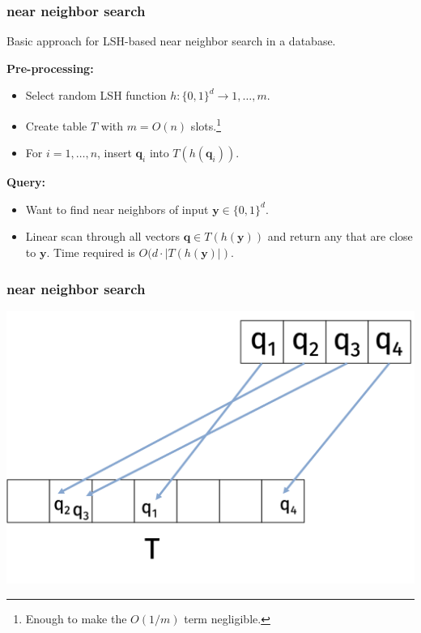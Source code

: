 \documentclass[compress]{beamer}
\newcommand{\bv}[1]{\mathbf{#1}}
\begin{document}
\begin{frame}
	\frametitle{near neighbor search}
	\begin{center}
	Basic approach for LSH-based near neighbor search in a database.
	\end{center}
		\textbf{Pre-processing:}
	\begin{itemize}
		\item Select random LSH function $h: \{0,1\}^d \rightarrow 1,\ldots, m$.
		\item Create table $T$ with $m = O(n)$ slots.\footnote{Enough to make the $O(1/m)$ term negligible.}
		\item For $i = 1,\ldots, n$, insert $\bv{q}_i$ into $T(h(\bv{q}_i))$.
	\end{itemize}
	\textbf{Query:}
	\begin{itemize}
		\item Want to find near neighbors of input $\bv{y}\in\{0,1\}^d$.
		\item Linear scan through all vectors $\bv{q}\in T(h(\bv{y}))$ and return any that are close to $\bv{y}$. Time required is $O(d\cdot |T(h(\bv{y})|)$.
	\end{itemize}
\vspace{1em}
\end{frame}

\begin{frame}
	\frametitle{near neighbor search}
	\begin{center}
		\includegraphics[width=.8\textwidth]{basicScheme.png}
	\end{center}
\end{frame}
\end{document}
